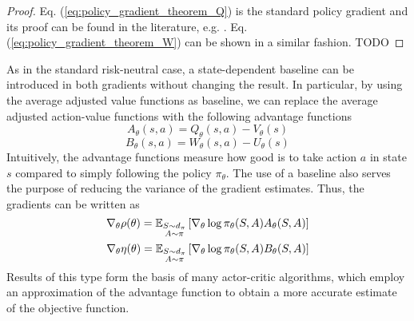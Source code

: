 \begin{proof}
	Eq. (\ref{eq:policy_gradient_theorem_Q}) is the standard policy gradient
	and its proof can be found in the literature, e.g. \cite{sutton1999policy}.
	Eq. (\ref{eq:policy_gradient_theorem_W}) can be shown in a similar fashion.
	TODO
\end{proof}
As in the standard risk-neutral case, a state-dependent baseline can be 
introduced in both gradients without changing the result. In particular, by 
using the average adjusted value functions as baseline, we can replace the 
average adjusted action-value functions with the following advantage functions
\begin{equation}
	A_\theta(s,a) = Q_\theta(s,a) - V_\theta(s)
\end{equation}
\begin{equation}
	B_\theta(s,a) = W_\theta(s,a) - U_\theta(s)
\end{equation}
Intuitively, the advantage functions measure how good is to take action $a$ in
state $s$ compared to simply following the policy $\pi_\theta$. The use of a
baseline also serves the purpose of reducing the variance of the gradient
estimates. Thus, the gradients can be written as 
\begin{equation}\label{eq:pg_advantage_Q}
	\nabla_\theta \rho(\theta) = \E[\substack{S\sim d_\pi \\ 
A \sim \pi}]{\nabla_\theta \log \pi_\theta(S,A) A_\theta(S,A)}
\end{equation}
\begin{equation}\label{eq:pg_advantage_W}
	\nabla_\theta \eta(\theta) = \E[\substack{S\sim d_\pi \\ 
A \sim \pi}]{\nabla_\theta \log \pi_\theta(S,A) B_\theta(S,A)}
\end{equation}
Results of this type form the basis of many actor-critic algorithms, which
employ an approximation of the advantage function to obtain a more accurate
estimate of the objective function. 

